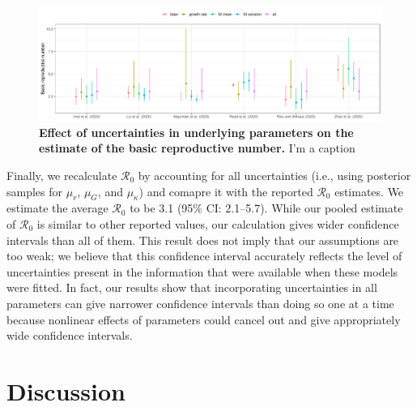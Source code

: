 \documentclass[12pt]{article}
\begin{document}
\begin{figure}[t]
\includegraphics[width=\textwidth]{compare_R0.pdf}
\caption{
\textbf{Effect of uncertainties in underlying parameters on the estimate of the basic reproductive number.}
I'm a caption
}
\label{fig:R0}
\end{figure}

Finally, we recalculate $\mathcal R_0$ by accounting for all uncertainties (i.e., using posterior samples for $\mu_r$, $\mu_G$, and $\mu_\kappa$) and comapre it with the reported $\mathcal R_0$ estimates.
We estimate the average $\mathcal R_0$ to be 3.1 (95\% CI: 2.1--5.7).
While our pooled estimate of $\mathcal R_0$ is similar to other reported values, our calculation gives wider confidence intervals than all of them.
This result does not imply that our assumptions are too weak;
we believe that this confidence interval accurately reflects the level of uncertainties present in the information that were available when these models were fitted.
In fact, our results show that incorporating uncertainties in all parameters can give narrower confidence intervals than doing so one at a time because nonlinear effects of parameters could cancel out and give appropriately wide confidence intervals.

\section{Discussion}






\pagebreak


\end{document}
